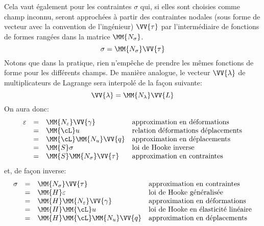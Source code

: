 Cela vaut également pour les contraintes $\sigma$ qui, si elles sont choisies comme champ
inconnu, seront approchées à partir des contraintes nodales (sous forme de vecteur avec
la convention de l'ingénieur) $\VV{\tau}$ par l'intermédiaire de fonctions de formes rangées
dans la matrice $\MM{N_\sigma}$.
\begin{equation}
   \sigma = \MM{N_\sigma}\VV{\tau}
\end{equation}
Notons que dans la pratique, rien n'empêche de prendre les mêmes fonctions
de forme pour les différents champs.
\medskip
De manière analogue, le vecteur $\VV{\lambda}$ de multiplicateurs
de Lagrange sera interpolé de la fa\c{c}on suivante:
\begin{equation}
   \VV{\lambda}=\MM{N_\lambda}\VV{L}
\end{equation}
\medskip
On aura donc:
\begin{equation}
   \begin{array}{rcll}
   \varepsilon &=& \MM{N_\varepsilon}\VV{\gamma}
                      &\text{approximation en déformations}\\
                    &=& \MM{\cL}u
                      &\text{relation déformations déplacements}\\
                    &=& \MM{\cL}\MM{N_u}\VV{q}
                      &\text{approximation en déplacements}\\
                    &=& \MM{S}\sigma
                      &\text{loi de Hooke inverse}\\
                    &=& \MM{S}\MM{N_\sigma}\VV{\tau}
                      &\text{approximation en contraintes}
   \end{array}
\end{equation}
et, de façon inverse:
\begin{equation}
   \begin{array}{rcll}
   \sigma &=& \MM{N_\sigma}\VV{\tau}
                      &\text{approximation en contraintes}\\
                    &=& \MM{H}\varepsilon
                      &\text{loi de Hooke généralisée}\\
                    &=& \MM{H}\MM{N_\varepsilon}\VV{\gamma}
                      &\text{approximation en déformations}\\
                    &=& \MM{H}\MM{\cL}u
                      &\text{loi de Hooke en élasticité linéaire}\\
                    &=& \MM{H}\MM{\cL}\MM{N_u}\VV{q}
                      &\text{approximation en déplacements}
   \end{array}
\end{equation}
